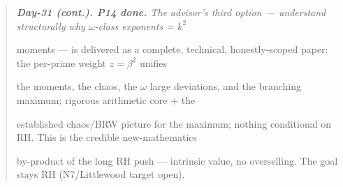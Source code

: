 \documentclass[10pt]{article}
\begin{document}
\begin{quote}\itshape
\textbf{Day-31 (cont.). P14 done.} The advisor's third option --- understand structurally why \ensuremath{\omega}-class exponents = $k^2$\par
moments --- is delivered as a complete, technical, honestly-scoped paper: the per-prime weight $z=\beta^2$ unifies\par
the moments, the chaos, the \ensuremath{\omega} large deviations, and the branching maximum; rigorous arithmetic core + the\par
established chaos/BRW picture for the maximum; nothing conditional on RH. This is the credible new-mathematics\par
by-product of the long RH push --- intrinsic value, no overselling. The goal stays RH (N7/Littlewood target open).\par
\end{quote}
\end{document}
